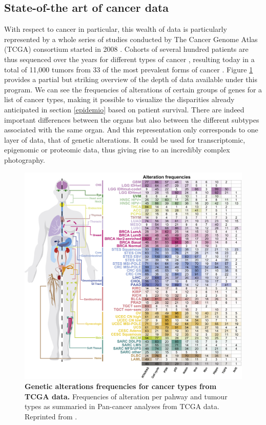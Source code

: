 \documentclass[a4paper,12pt,twoside,onecolumn,openright,final,oldfontcommands]{memoir}
\begin{document}
\subsection{State-of-the art of cancer
data}\label{state-of-the-art-of-cancer-data}

With respect to cancer in particular, this wealth of data is
particularly represented by a whole series of studies conducted by The
Cancer Genome Atlas (TCGA) consortium started in 2008
\citep{cancer2008comprehensive}. Cohorts of several hundred patients are
thus sequenced over the years for different types of cancer
\citep{cancer2012comprehensive}, resulting today in a total of 11,000
tumors from 33 of the most prevalent forms of cancer
\citep{ding2018perspective}. Figure \ref{fig:tcga} provides a partial
but striking overview of the depth of data available under this program.
We can see the frequencies of alterations of certain groups of genes for
a list of cancer types, making it possible to visualize the disparities
already anticipated in section \ref{epidemio} based on patient survival.
There are indeed important differences between the organs but also
between the different subtypes associated with the same organ. And this
representation only corresponds to one layer of data, that of genetic
alterations. It could be used for transcriptomic, epigenomic or
proteomic data, thus giving rise to an incredibly complex photography.

\begin{figure}

{\centering \includegraphics[width=0.9\linewidth]{fig/tcga} 

}

\caption[Genetic alterations frequencies for cancer types from TCGA data]{\textbf{Genetic alterations frequencies for cancer
types from TCGA data.} Frequencies of alteration per pahway and tumour
types as summaried in Pan-cancer analyses from TCGA data. Reprinted from
\citet{sanchez2018oncogenic}.}\label{fig:tcga}
\end{figure}
\end{document}

